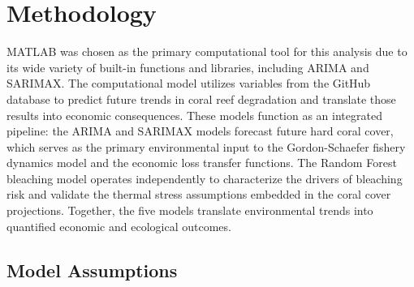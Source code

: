 \documentclass[10pt,letterpaper]{article}
\begin{document}
\section{Methodology}

MATLAB was chosen as the primary computational tool for this analysis due to its wide variety of built-in functions and libraries, including ARIMA and SARIMAX. The computational model utilizes variables from the GitHub database to predict future trends in coral reef degradation and translate those results into economic consequences. These models function as an integrated pipeline: the ARIMA and SARIMAX models forecast future hard coral cover, which serves as the primary environmental input to the Gordon-Schaefer fishery dynamics model and the economic loss transfer functions. The Random Forest bleaching model operates independently to characterize the drivers of bleaching risk and validate the thermal stress assumptions embedded in the coral cover projections. Together, the five models translate environmental trends into quantified economic and ecological outcomes.

\subsection{Model Assumptions}
\label{sec:model-assumptions}
\end{document}
